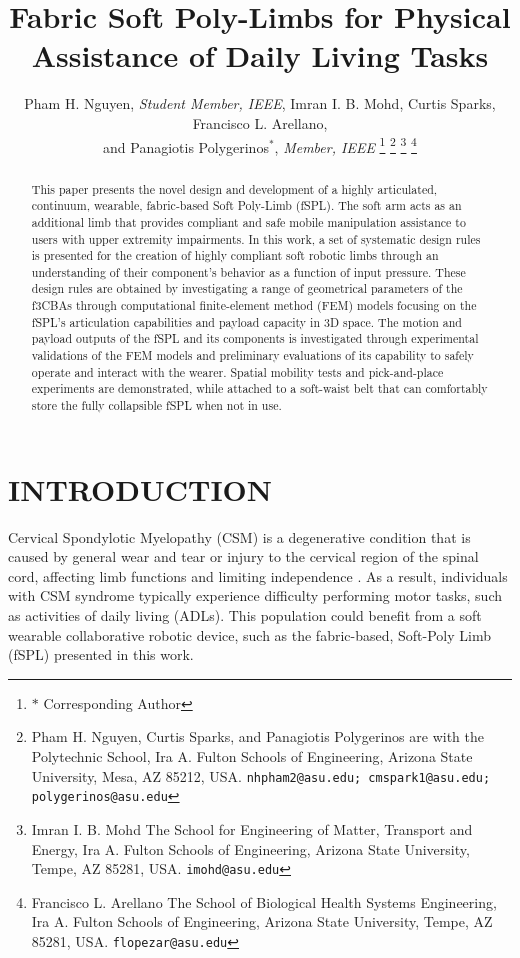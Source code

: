 \documentclass[letterpaper, 10 pt, conference]{ieeeconf}  %
\title{\LARGE \bf
Fabric Soft Poly-Limbs for Physical Assistance of Daily Living Tasks  
}
\author{Pham H. Nguyen, \textit{Student Member, IEEE}, Imran I. B. Mohd, Curtis Sparks, Francisco L. Arellano,\\ and Panagiotis Polygerinos$^{*}$, \textit{Member, IEEE}%
\thanks{$*$ Corresponding Author}%
\thanks{Pham H. Nguyen, Curtis Sparks, and Panagiotis Polygerinos are with the Polytechnic School, Ira A. Fulton Schools of Engineering, Arizona State University, Mesa, AZ 85212, USA. 
         {\tt\small nhpham2@asu.edu; cmspark1@asu.edu; polygerinos@asu.edu}}%
\thanks{Imran I. B. Mohd The School for Engineering of Matter, Transport and Energy, Ira A. Fulton Schools of Engineering, Arizona State University, Tempe, AZ 85281, USA.
        {\tt\small imohd@asu.edu}}%
\thanks{Francisco L. Arellano The School of Biological Health Systems Engineering, Ira A. Fulton Schools of Engineering, Arizona State University, Tempe, AZ 85281, USA.
        {\tt\small flopezar@asu.edu}}%
}
\begin{document}
\maketitle
\thispagestyle{empty}
\pagestyle{empty}


\begin{abstract}

This paper presents the novel design and development of a highly articulated, continuum, wearable, fabric-based Soft Poly-Limb (fSPL). The soft arm acts as an additional limb that provides compliant and safe mobile manipulation assistance to users with upper extremity impairments. In this work, a set of systematic design rules is presented for the creation of highly compliant soft robotic limbs through an understanding of their component’s behavior as a function of input pressure. These design rules are obtained by investigating a range of geometrical parameters of the f3CBAs through computational finite-element method (FEM) models focusing on the fSPL's articulation capabilities and payload capacity in 3D space. The motion and payload outputs of the fSPL and its components is investigated through experimental validations of the FEM models and preliminary evaluations of its capability to safely operate and interact with the wearer. Spatial mobility tests and pick-and-place experiments are demonstrated, while attached to a soft-waist belt that can comfortably store the fully collapsible fSPL when not in use.

\end{abstract}

\section{INTRODUCTION}

Cervical Spondylotic Myelopathy (CSM) is a degenerative condition that is caused by general wear and tear or injury to the cervical region of the spinal cord, affecting limb functions and limiting independence \cite{lubelski2016}. As a result, individuals with CSM syndrome typically experience difficulty performing motor tasks, such as activities of daily living (ADLs). This population could benefit from a soft wearable collaborative robotic device, such as the fabric-based, Soft-Poly Limb (fSPL) presented in this work.
\end{document}
